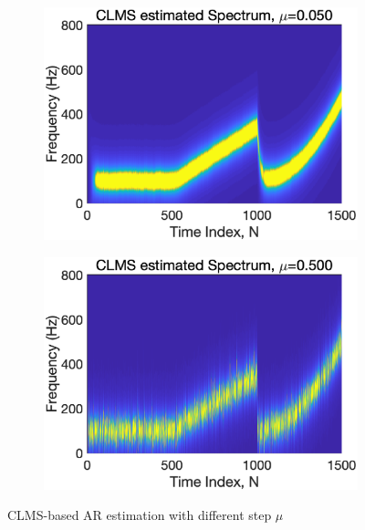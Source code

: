 \begin{figure}[htb]
\begin{subfigure}[b]{0.35\textwidth}
         \centering
         \includegraphics[width=\textwidth]{fig/32/32b3.eps}
     \end{subfigure}
     \hspace{0.4cm}
     \begin{subfigure}[b]{0.35\textwidth}
         \centering
         \includegraphics[width=\textwidth]{fig/32/32b4.eps}
     \end{subfigure}
        \caption{CLMS-based AR estimation with different step $\mu$}
        \label{fig:3_2_b}
\end{figure}
